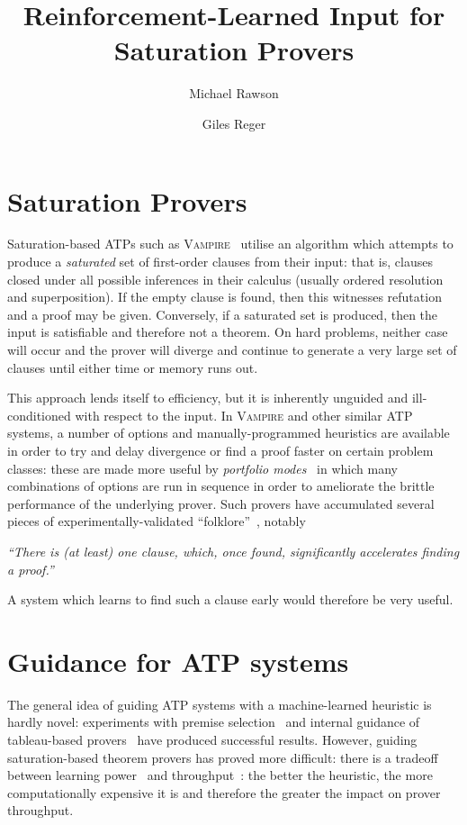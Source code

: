 \documentclass[twocolumn,a4paper,10pt]{article}
\title{Reinforcement-Learned Input for Saturation Provers}
\institute{University of Manchester, UK}
\author{Michael Rawson \and Giles Reger}
\institute{University of Manchester, UK}
\newcommand{\vampire}{\textsc{Vampire}}
\begin{document}
\maketitle{}
\section{Saturation Provers}
Saturation-based ATPs such as \vampire{}~\cite{vampire} utilise an algorithm which attempts to produce a \emph{saturated} set of first-order clauses from their input: that is, clauses closed under all possible inferences in their calculus (usually ordered resolution and superposition).
If the empty clause is found, then this witnesses refutation and a proof may be given.
Conversely, if a saturated set is produced, then the input is satisfiable and therefore not a theorem.
On hard problems, neither case will occur and the prover will diverge and continue to generate a very large set of clauses until either time or memory runs out.

This approach lends itself to efficiency, but it is inherently unguided and ill-conditioned with respect to the input.
In \vampire{} and other similar ATP systems, a number of options and manually-programmed heuristics are available in order to try and delay divergence or find a proof faster on certain problem classes: these are made more useful by \emph{portfolio modes}~\cite{portfolio} in which many combinations of options are run in sequence in order to ameliorate the brittle performance of the underlying prover.
Such provers have accumulated several pieces of experimentally-validated ``folklore''~\cite{slowly-growing,fewest-children}, notably
\begin{tcolorbox}
	\centering
	\emph{``There is (at least) one clause, which, once found, significantly accelerates finding a proof.''}
\end{tcolorbox}
\noindent
A system which learns to find such a clause early would therefore be very useful.

\section{Guidance for ATP systems}
The general idea of guiding ATP systems with a machine-learned heuristic is hardly novel: experiments with premise selection~\cite{premise-selection} and internal guidance of tableau-based provers~\cite{rlcop} have produced successful results.
However, guiding saturation-based theorem provers has proved more difficult: there is a tradeoff between learning power~\cite{dngps} and throughput~\cite{enigma}: the better the heuristic, the more computationally expensive it is and therefore the greater the impact on prover throughput.
\end{document}
